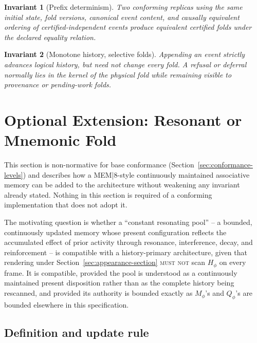 \documentclass[11pt]{article}
\newtheorem{invariant}{Invariant}
\newcommand{\MUSTNOT}{\textsc{must not}}
\begin{document}
\begin{invariant}[Prefix determinism]
Two conforming replicas using the same initial state, fold versions, canonical event content, and causally equivalent ordering of certified-independent events produce equivalent certified folds under the declared equality relation.
\end{invariant}

\begin{invariant}[Monotone history, selective folds]
Appending an event strictly advances logical history, but need not change every fold. A refusal or deferral normally lies in the kernel of the physical fold while remaining visible to provenance or pending-work folds.
\end{invariant}

\section{Optional Extension: Resonant or Mnemonic Fold}
\label{sec:resonant}

This section is non-normative for base conformance (Section~\ref{sec:conformance-levels}) and describes how a MEM|8-style continuously maintained associative memory can be added to the architecture without weakening any invariant already stated. Nothing in this section is required of a conforming implementation that does not adopt it.

The motivating question is whether a ``constant resonating pool'' -- a bounded, continuously updated memory whose present configuration reflects the accumulated effect of prior activity through resonance, interference, decay, and reinforcement -- is compatible with a history-primary architecture, given that rendering under Section~\ref{sec:appearance-section} \MUSTNOT{} scan $H_\phi$ on every frame. It is compatible, provided the pool is understood as a continuously maintained present disposition rather than as the complete history being rescanned, and provided its authority is bounded exactly as $M_\phi$'s and $Q_\phi$'s are bounded elsewhere in this specification.

\subsection{Definition and update rule}
\end{document}
